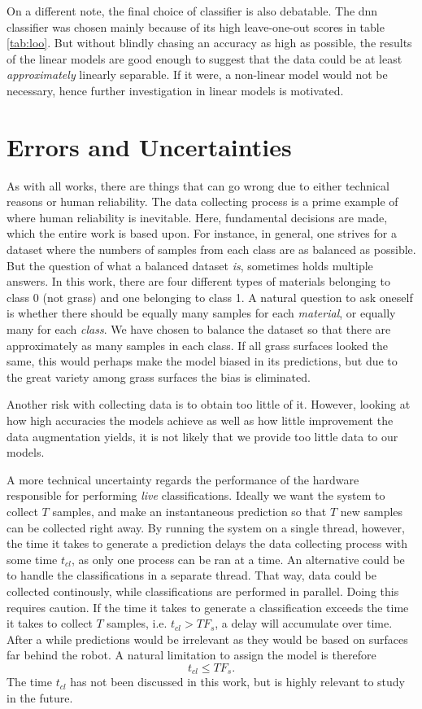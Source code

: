 On a different note, the final choice of classifier is also debatable. The \gls{dnn} classifier was chosen mainly because of its high leave-one-out scores in table \ref{tab:loo}. But without blindly chasing an accuracy as high as possible, the results of the linear models are good enough to suggest that the data could be at least \textit{approximately} linearly separable. If it were, a non-linear model would not be necessary, hence further investigation in linear models is motivated.

\section{Errors and Uncertainties}
As with all works, there are things that can go wrong due to either technical reasons or human reliability. The data collecting process is a prime example of where human reliability is inevitable. Here, fundamental decisions are made, which the entire work is based upon. For instance, in general, one strives for a dataset where the numbers of samples from each class are as balanced as possible. But the question of what a balanced dataset \textit{is}, sometimes holds multiple answers. In this work, there are four different types of materials belonging to class 0 (not grass) and one belonging to class 1. A natural question to ask oneself is whether there should be equally many samples for each \textit{material}, or equally many for each \textit{class}. We have chosen to balance the dataset so that there are approximately as many samples in each class. If all grass surfaces looked the same, this would perhaps make the model biased in its predictions, but due to the great variety among grass surfaces the bias is eliminated.

Another risk with collecting data is to obtain too little of it. However, looking at how high accuracies the models achieve as well as how little improvement the data augmentation yields, it is not likely that we provide too little data to our models.

A more technical uncertainty regards the performance of the hardware responsible for performing \textit{live} classifications. Ideally we want the system to collect $T$ samples, and make an instantaneous prediction so that $T$ new samples can be collected right away. By running the system on a single thread, however, the time it takes to generate a prediction delays the data collecting process with some time $t_{cl}$, as only one process can be ran at a time. An alternative could be to handle the classifications in a separate thread. That way, data could be collected continously, while classifications are performed in parallel. Doing this requires caution. If the time it takes to generate a classification exceeds the time it takes to collect $T$ samples, i.e. $t_{cl}>TF_s$, a delay will accumulate over time. After a while predictions would be irrelevant as they would be based on surfaces far behind the robot. A natural limitation to assign the model is therefore
\begin{equation}
	t_{cl} \le TF_s.
\end{equation}
The time $t_{cl}$ has not been discussed in this work, but is highly relevant to study in the future.



